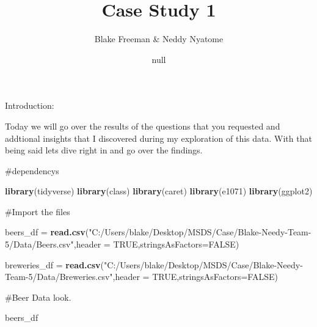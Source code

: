 \documentclass[
]{article}
\title{Case Study 1}
\author{Blake Freeman \& Neddy Nyatome}
\date{null}
\newenvironment{Shaded}{\begin{snugshade}}{\end{snugshade}}
\newcommand{\DataTypeTok}[1]{\textcolor[rgb]{0.13,0.29,0.53}{#1}}
\newcommand{\KeywordTok}[1]{\textcolor[rgb]{0.13,0.29,0.53}{\textbf{#1}}}
\newcommand{\NormalTok}[1]{#1}
\newcommand{\OtherTok}[1]{\textcolor[rgb]{0.56,0.35,0.01}{#1}}
\newcommand{\StringTok}[1]{\textcolor[rgb]{0.31,0.60,0.02}{#1}}
\begin{document}
\maketitle

Introduction:

Today we will go over the results of the questions that you requested
and addtional insights that I discovered during my exploration of this
data. With that being said lets dive right in and go over the findings.

\#dependencys

\begin{Shaded}
\begin{Highlighting}[]
\KeywordTok{library}\NormalTok{(tidyverse)}
\KeywordTok{library}\NormalTok{(class)}
\KeywordTok{library}\NormalTok{(caret)}
\KeywordTok{library}\NormalTok{(e1071)}
\KeywordTok{library}\NormalTok{(ggplot2)}
\end{Highlighting}
\end{Shaded}

\#Import the files

\begin{Shaded}
\begin{Highlighting}[]
\NormalTok{beers_df =}\StringTok{ }\KeywordTok{read.csv}\NormalTok{(}\StringTok{"C:/Users/blake/Desktop/MSDS/Case/Blake-Needy-Team-5/Data/Beers.csv"}\NormalTok{,}\DataTypeTok{header =} \OtherTok{TRUE}\NormalTok{,}\DataTypeTok{stringsAsFactors=}\OtherTok{FALSE}\NormalTok{)}

\NormalTok{breweries_df =}\StringTok{ }\KeywordTok{read.csv}\NormalTok{(}\StringTok{"C:/Users/blake/Desktop/MSDS/Case/Blake-Needy-Team-5/Data/Breweries.csv"}\NormalTok{,}\DataTypeTok{header =} \OtherTok{TRUE}\NormalTok{,}\DataTypeTok{stringsAsFactors=}\OtherTok{FALSE}\NormalTok{)}
\end{Highlighting}
\end{Shaded}

\#Beer Data look.

\begin{Shaded}
\begin{Highlighting}[]
\NormalTok{beers_df}
\end{Highlighting}
\end{Shaded}
\end{document}
